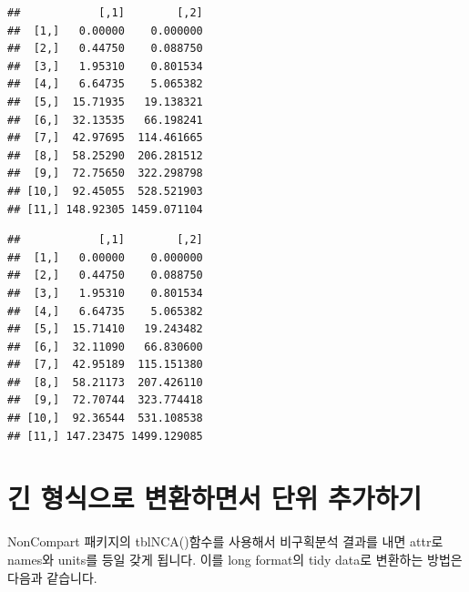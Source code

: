 \documentclass[
  10pt,
]{krantz}
\makeatletter
\newenvironment{Shaded}{\begin{snugshade}}{\end{snugshade}}
\newcommand{\DataTypeTok}[1]{\textcolor[rgb]{0.13,0.29,0.53}{#1}}
\newcommand{\DecValTok}[1]{\textcolor[rgb]{0.00,0.00,0.81}{#1}}
\newcommand{\KeywordTok}[1]{\textcolor[rgb]{0.13,0.29,0.53}{\textbf{#1}}}
\newcommand{\NormalTok}[1]{#1}
\newcommand{\OperatorTok}[1]{\textcolor[rgb]{0.81,0.36,0.00}{\textbf{#1}}}
\newcommand{\StringTok}[1]{\textcolor[rgb]{0.31,0.60,0.02}{#1}}
\newenvironment{kframe}{%
\medskip{}
\setlength{\fboxsep}{.8em}
 \def\at@end@of@kframe{}%
 \ifinner\ifhmode%
  \def\at@end@of@kframe{\end{minipage}}%
  \begin{minipage}{\columnwidth}%
 \fi\fi%
 \def\FrameCommand##1{\hskip\@totalleftmargin \hskip-\fboxsep
 \colorbox{shadecolor}{##1}\hskip-\fboxsep
     \hskip-\linewidth \hskip-\@totalleftmargin \hskip\columnwidth}%
 \MakeFramed {\advance\hsize-\width
   \@totalleftmargin\z@ \linewidth\hsize
   \@setminipage}}%
 {\par\unskip\endMakeFramed%
 \at@end@of@kframe}
\renewenvironment{Shaded}{\begin{kframe}}{\end{kframe}}
\makeatother
\begin{document}
\begin{verbatim}
##            [,1]        [,2]
##  [1,]   0.00000    0.000000
##  [2,]   0.44750    0.088750
##  [3,]   1.95310    0.801534
##  [4,]   6.64735    5.065382
##  [5,]  15.71935   19.138321
##  [6,]  32.13535   66.198241
##  [7,]  42.97695  114.461665
##  [8,]  58.25290  206.281512
##  [9,]  72.75650  322.298798
## [10,]  92.45055  528.521903
## [11,] 148.92305 1459.071104
\end{verbatim}

\begin{Shaded}
\end{Shaded}

\begin{verbatim}
##            [,1]        [,2]
##  [1,]   0.00000    0.000000
##  [2,]   0.44750    0.088750
##  [3,]   1.95310    0.801534
##  [4,]   6.64735    5.065382
##  [5,]  15.71410   19.243482
##  [6,]  32.11090   66.830600
##  [7,]  42.95189  115.151380
##  [8,]  58.21173  207.426110
##  [9,]  72.70744  323.774418
## [10,]  92.36544  531.108538
## [11,] 147.23475 1499.129085
\end{verbatim}

\hypertarget{long-format}{%
\section{긴 형식으로 변환하면서 단위 추가하기}\label{long-format}}

NonCompart 패키지의 tblNCA()함수를 사용해서 비구획분석 결과를 내면 attr로 names와 units를 등일 갖게 됩니다. 이를 long format의 tidy data로 변환하는 방법은 다음과 같습니다.

\begin{Shaded}
\end{Shaded}
\end{document}
